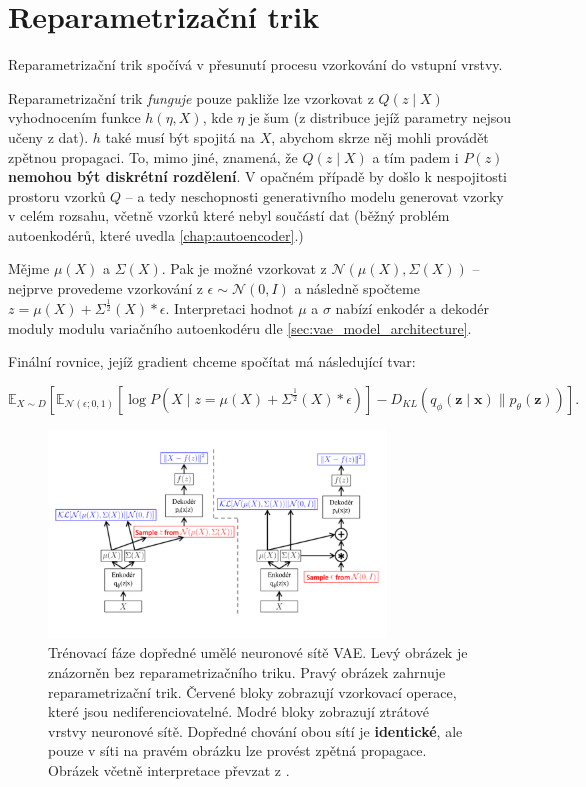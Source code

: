 \section{Reparametrizační trik}
\label{sec:reparametrization_trick}
Reparametrizační trik spočívá v přesunutí procesu vzorkování do vstupní vrstvy. \cite{Doersch2021}

Reparametrizační trik \emph{funguje} pouze pakliže lze vzorkovat z $Q(z\mid X)$ vyhodnocením funkce $h(\eta, X)$, kde $\eta$ je šum (z distribuce jejíž parametry nejsou učeny z dat). $h$ také musí být spojitá na $X$, abychom skrze něj mohli provádět zpětnou propagaci.
To, mimo jiné, znamená, že $Q(z\mid X)$ a tím padem i $P(z)$ \textbf{nemohou být diskrétní rozdělení}. V opačném případě by došlo k nespojitosti prostoru vzorků $Q$ – a tedy neschopnosti generativního modelu generovat vzorky v celém rozsahu, včetně vzorků které nebyl součástí dat (běžný problém autoenkodérů, které uvedla \autoref{chap:autoencoder}.)

Mějme $\mu(X)$ a $\Sigma(X)$. Pak je možné vzorkovat z $\mathcal{N}(\mu(X), \Sigma(X))$ – nejprve provedeme vzorkování z $\epsilon \sim \mathcal{N}(0, I)$ a následně spočteme $z = \mu(X) + \Sigma^{\frac{1}{2}}(X) * \epsilon$. \cite{Doersch2021}
Interpretaci hodnot $\mu$ a $\sigma$ nabízí enkodér a dekodér moduly modulu variačního autoenkodéru dle \autoref{sec:vae_model_architecture}.

Finální rovnice, jejíž gradient chceme spočítat má následující tvar:

\begin{equation} \label{eq:vae_reparam_trick}
    \mathds{E}_{X \sim D} \left[ \mathds{E}_{\mathcal{N}(\epsilon; 0, 1)} \left[ \log P(X\mid z = \mu(X) + \Sigma^{\frac{1}{2}} (X) * \epsilon) \right] -  D_{KL}(q_\phi(\textbf{z}\mid\textbf{x})\parallel p_\theta(\textbf{z})) \right].
\end{equation}

\begin{figure}[H]
    \centering
    \includegraphics[width=0.8\textwidth]{figures/vae_backpropagation.pdf}
    \caption{Trénovací fáze dopředné umělé neuronové sítě VAE. Levý obrázek je znázorněn bez reparametrizačního triku. Pravý obrázek zahrnuje reparametrizační trik. Červené bloky zobrazují vzorkovací operace, které jsou nediferenciovatelné. Modré bloky zobrazují ztrátové vrstvy neuronové sítě. Dopředné chování obou sítí je \textbf{identické}, ale pouze v síti na pravém obrázku lze provést zpětná propagace. Obrázek včetně interpretace převzat z \cite{Doersch2021}.}
    \label{fig:vae_backpropagation}
\end{figure}

